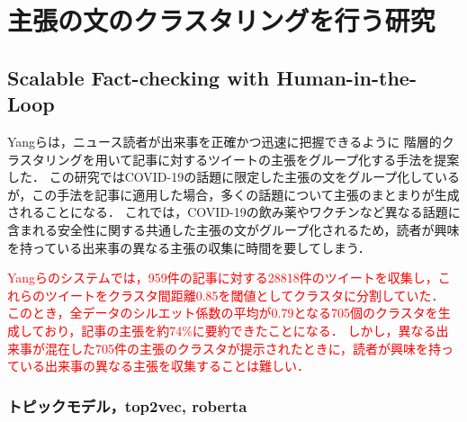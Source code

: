 \documentclass[12pt,a4j]{jreport}
\begin{document}
\section{主張の文のクラスタリングを行う研究}

\subsection{Scalable Fact-checking with Human-in-the-Loop}
\label{subsection_scalable_fact_checking}

Yangらは，ニュース読者が出来事を正確かつ迅速に把握できるように
階層的クラスタリングを用いて記事に対するツイートの主張をグループ化する手法を提案した\cite{yang_scalable_2021}．
この研究ではCOVID-19の話題に限定した主張の文をグループ化しているが，この手法を記事に適用した場合，多くの話題について主張のまとまりが生成されることになる．
これでは，COVID-19の飲み薬やワクチンなど異なる話題に含まれる安全性に関する共通した主張の文がグループ化されるため，読者が興味を持っている出来事の異なる主張の収集に時間を要してしまう．

\textcolor{red}{
Yangらのシステムでは，959件の記事に対する28818件のツイートを収集し，これらのツイートをクラスタ間距離0.85を閾値としてクラスタに分割していた．
このとき，全データのシルエット係数の平均が0.79となる705個のクラスタを生成しており，記事の主張を約74\%に要約できたことになる．
しかし，異なる出来事が混在した705件の主張のクラスタが提示されたときに，読者が興味を持っている出来事の異なる主張を収集することは難しい．
}


\subsubsection{トピックモデル，top2vec, roberta}
~

~
\end{document}
